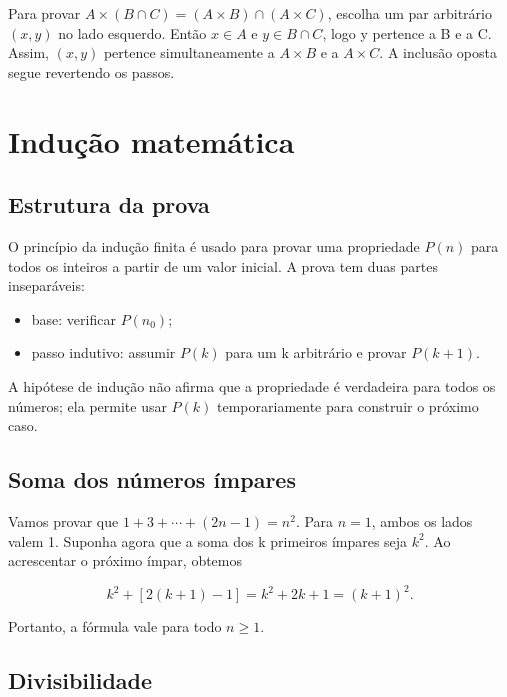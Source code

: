 \documentclass[12pt,a4paper,openany]{book}
\begin{document}
Para provar $A\times(B\cap C)=(A\times B)\cap(A\times C)$, escolha um par arbitrário $(x,y)$ no lado esquerdo. Então $x\in A$ e $y\in B\cap C$, logo y pertence a B e a C. Assim, $(x,y)$ pertence simultaneamente a $A\times B$ e a $A\times C$. A inclusão oposta segue revertendo os passos.



\chapter{Indução matemática}



\section{Estrutura da prova}



O princípio da indução finita é usado para provar uma propriedade $P(n)$ para todos os inteiros a partir de um valor inicial. A prova tem duas partes inseparáveis:



\begin{itemize}
\item base: verificar $P(n_0)$;
\item passo indutivo: assumir $P(k)$ para um k arbitrário e provar $P(k+1)$.
\end{itemize}



A hipótese de indução não afirma que a propriedade é verdadeira para todos os números; ela permite usar $P(k)$ temporariamente para construir o próximo caso.



\section{Soma dos números ímpares}



Vamos provar que $1+3+\cdots+(2n-1)=n^2$. Para $n=1$, ambos os lados valem 1. Suponha agora que a soma dos k primeiros ímpares seja $k^2$. Ao acrescentar o próximo ímpar, obtemos



\[k^2+[2(k+1)-1]=k^2+2k+1=(k+1)^2.\]



Portanto, a fórmula vale para todo $n\geq1$.



\section{Divisibilidade}
\end{document}
